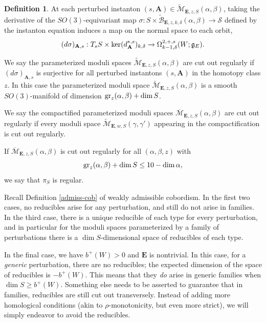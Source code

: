 \documentclass{memo-l}
\theoremstyle{definition}
\newtheorem{definition}[theorem]{Definition}
\theoremstyle{remark}
\numberwithin{section}{chapter}
\numberwithin{equation}{chapter}
\begin{document}
\begin{definition}\label{regfamily}At each perturbed instanton $(s, \mathbf{A}) \in \widetilde{\mathcal M}_{\mathbf{E},z,S}(\alpha, \beta)$, taking the derivative of the $SO(3)$-equivariant map $\sigma: S \times \widetilde{\mathcal B}_{\mathbf{E}, z,k,\delta}(\alpha, \beta) \to \mathcal S$ defined by the instanton equation induces a map on the normal space to each orbit, $$(d\sigma)_{\mathbf{A}, s}: T_s S \times \textup{ker}(d_{\mathbf{A}}^{*,s})_{k,\delta} \to \Omega^{2,{+,s}}_{k-1,\delta}(W;\mathfrak g_E).$$

We say the parameterized moduli spaces $\widetilde{\mathcal M}_{\mathbf{E},z,S}(\alpha, \beta)$ are cut out regularly if $(d\sigma)_{\mathbf{A},s}$ is surjective for all perturbed instantons $(s,\mathbf{A})$ in the homotopy class $z$. In this case the parameterized moduli space $\widetilde{\mathcal M}_{\mathbf{E},z,S}(\alpha, \beta)$ is a smooth $SO(3)$-manifold of dimension $\textup{gr}_z(\alpha, \beta) + \dim S$.

We say the compactified parameterized moduli spaces $\overline{\mathcal M}_{\mathbf{E},z,S}(\alpha, \beta)$ are cut out regularly if every moduli space $\widetilde{\mathcal M}_{\mathbf{E},w,S}(\gamma, \gamma')$ appearing in the compactification is cut out regularly.

If $\overline{\mathcal M}_{\mathbf{E},z,S}(\alpha, \beta)$ is cut out regularly for all $(\alpha, \beta, z)$ with
$$\textup{gr}_z(\alpha, \beta) + \dim S \leq 10 - \dim \alpha,$$
we say that $\pi_S$ is regular.
\end{definition}

Recall Definition \ref{admiss-cob} of weakly admissible cobordism. In the first two cases, no reducibles arise for any perturbation, and still do not arise in families. In the third case, there is a unique reducible of each type for every perturbation, and in particular for the moduli spaces parameterized by a family of perturbations there is a $\dim S$-dimensional space of reducibles of each type.

In the final case, we have $b^+(W) > 0$ and $\mathbf{E}$ is nontrivial. In this case, for a \emph{generic} perturbation, there are no reducibles; the expected dimension of the space of reducibles is $-b^+(W)$. This means that they \emph{do} arise in generic families when $\dim S \geq b^+(W)$. Something else needs to be asserted to guarantee that in families, reducibles are still cut out transversely. Instead of adding more homological conditions (akin to $\rho$-monotonicity, but even more strict), we will simply endeavor to avoid the reducibles.
\end{document}
